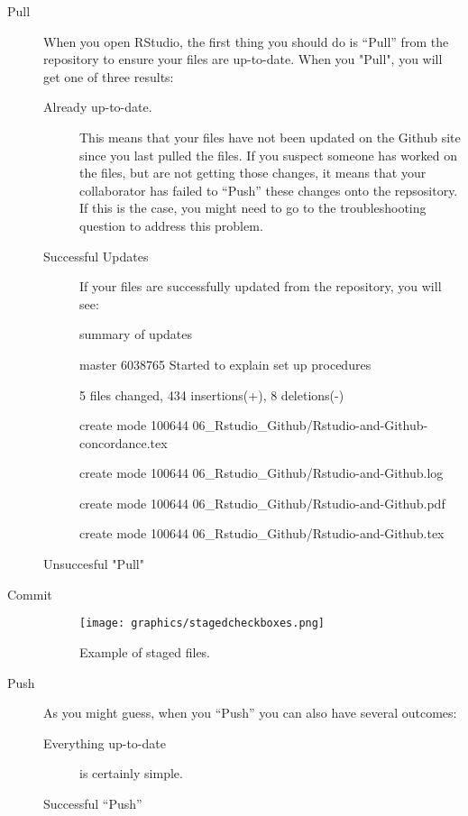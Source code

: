 \documentclass[12pt]{../SOP4_alpha}\usepackage[]{graphicx}\usepackage[]{xcolor}
\begin{document}
\begin{description}
  \item[Pull] When you open RStudio, the first thing you should do is ``Pull'' from the repository to ensure your files are up-to-date. When you "Pull", you will get one of three results:
  
  \begin{description}
  \item[Already up-to-date.] This means that your files have not been updated on the Github site since you last pulled the files. If you suspect someone has worked on the files, but are not getting those changes, it means that your collaborator has failed to ``Push'' these changes onto the repsository. If this is the case, you might need to go to the troubleshooting question to address this problem.
  
  \item[Successful Updates] If your files are successfully updated from the repository, you will see:
  
summary of updates

master 6038765 Started to explain set up procedures
 
 5 files changed, 434 insertions(+), 8 deletions(-)
 
 create mode 100644 06\_Rstudio\_Github/Rstudio-and-Github-concordance.tex
 
 create mode 100644 06\_Rstudio\_Github/Rstudio-and-Github.log
 
 create mode 100644 06\_Rstudio\_Github/Rstudio-and-Github.pdf
 
 create mode 100644 06\_Rstudio\_Github/Rstudio-and-Github.tex
 
 \item[Unsuccesful "Pull"]
 
 
\end{description}

  \item[Commit]
  
\begin{figure}[H]
\centering
\texttt{[image: graphics/stagedcheckboxes.png]}
\caption{Example of staged files.}
\label{fig:stagedcheckboxes}
\end{figure}

  \item[Push] As you might guess, when you ``Push'' you can also have several outcomes:
\begin{description}
  \item[Everything up-to-date] is certainly simple.   \item[Successful ``Push'']
  

\end{description}
\end{description}
\end{document}
